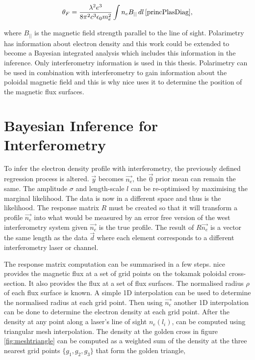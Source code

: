 \begin{equation}
  \label{eq:pol_farad}
  \theta_F = \frac{\lambda^2 e^3}{8 \pi^2 c^3 \epsilon_0 m_e^2} \int n_e B_{||} \, dl \, \cite{princPlasDiag},
\end{equation}

\noindent where $B_{||}$ is the magnetic field strength parallel to the line of sight. Polarimetry has information about electron density and this work could be extended to become a Bayesian integrated analysis which includes this information in the inference. Only interferometry information is used in this thesis. Polarimetry can be used in combination with interferometry to gain information about the poloidal magnetic field and this is why \gls{nice} uses it to determine the position of the magnetic flux surfaces.

\section{Bayesian Inference for Interferometry}\label{sec:InfForInterf}

To infer the electron density profile with interferometry, the previously defined regression process is altered. $\vec{y}$ becomes $\vec{n_e}$, the $\vec{0}$ prior mean can remain the same. The amplitude $\sigma$ and length-scale $l$ can be re-optimised by maximising the marginal likelihood. The data is now in a different space and thus is the likelihood. The response matrix $R$ must be created so that it will transform a profile $\vec{n_e}$ into what would be measured by an error free version of the \gls{west} interferometry system given $\vec{n_e}$ is the true profile. The result of $R \vec{n_e}$ is a vector the same length as the data $\vec{d}$ where each element corresponds to a different interferometry laser or channel. 

The response matrix computation can be summarised in a few steps. \Gls{nice} provides the magnetic flux at a set of grid points on the tokamak poloidal cross-section. It also provides the flux at a set of flux surfaces. The normalised radius $\rho$ of each flux surface is known. A simple 1D interpolation can be used to determine the normalised radius at each grid point. Then using $\vec{n_e}$ another 1D interpolation can be done to determine the electron density at each grid point. After the density at any point along a laser's line of sight $n_e(l_i)$, can be computed using triangular mesh interpolation. The density at the golden cross in figure \ref{fig:meshtriangle} can be computed as a weighted sum of the density at the three nearest grid points $\{g_1, g_2, g_3\}$ that form the golden triangle,


